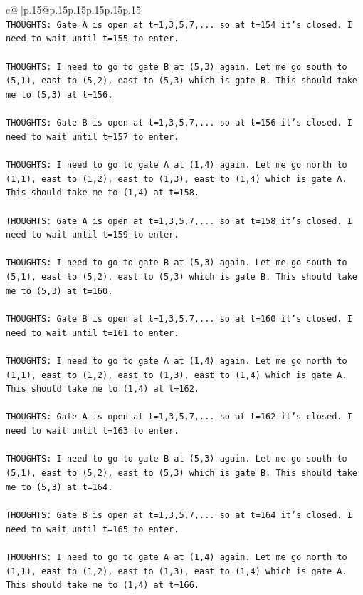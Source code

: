 \documentclass{article}
\begin{document}
{\begin{supertabular}{c@{$\;$}|p{.15\linewidth}@{}p{.15\linewidth}p{.15\linewidth}p{.15\linewidth}p{.15\linewidth}p{.15\linewidth}}
{{{\\ 
\texttt{THOUGHTS: Gate A is open at t=1,3,5,7,... so at t=154 it's closed. I need to wait until t=155 to enter.} \\
\\ 
\texttt{THOUGHTS: I need to go to gate B at (5,3) again. Let me go south to (5,1), east to (5,2), east to (5,3) which is gate B. This should take me to (5,3) at t=156.} \\
\\ 
\texttt{THOUGHTS: Gate B is open at t=1,3,5,7,... so at t=156 it's closed. I need to wait until t=157 to enter.} \\
\\ 
\texttt{THOUGHTS: I need to go to gate A at (1,4) again. Let me go north to (1,1), east to (1,2), east to (1,3), east to (1,4) which is gate A. This should take me to (1,4) at t=158.} \\
\\ 
\texttt{THOUGHTS: Gate A is open at t=1,3,5,7,... so at t=158 it's closed. I need to wait until t=159 to enter.} \\
\\ 
\texttt{THOUGHTS: I need to go to gate B at (5,3) again. Let me go south to (5,1), east to (5,2), east to (5,3) which is gate B. This should take me to (5,3) at t=160.} \\
\\ 
\texttt{THOUGHTS: Gate B is open at t=1,3,5,7,... so at t=160 it's closed. I need to wait until t=161 to enter.} \\
\\ 
\texttt{THOUGHTS: I need to go to gate A at (1,4) again. Let me go north to (1,1), east to (1,2), east to (1,3), east to (1,4) which is gate A. This should take me to (1,4) at t=162.} \\
\\ 
\texttt{THOUGHTS: Gate A is open at t=1,3,5,7,... so at t=162 it's closed. I need to wait until t=163 to enter.} \\
\\ 
\texttt{THOUGHTS: I need to go to gate B at (5,3) again. Let me go south to (5,1), east to (5,2), east to (5,3) which is gate B. This should take me to (5,3) at t=164.} \\
\\ 
\texttt{THOUGHTS: Gate B is open at t=1,3,5,7,... so at t=164 it's closed. I need to wait until t=165 to enter.} \\
\\ 
\texttt{THOUGHTS: I need to go to gate A at (1,4) again. Let me go north to (1,1), east to (1,2), east to (1,3), east to (1,4) which is gate A. This should take me to (1,4) at t=166.} \\
}}}
\end{supertabular}}
\end{document}
